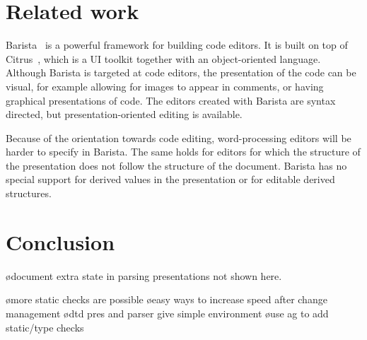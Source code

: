\documentclass[12pt]{article}
\begin{document}
%
\section{Related work}\label{sect:relatedWork}
%

\bc
{}





\noindent Barista~\cite{KoMyers06Barista} is a powerful framework for building code editors. It is built on top of Citrus~\cite{KoMyers05Citrus}, which is a UI toolkit together with an object-oriented language. Although Barista is targeted at code editors, the presentation of the code can be visual, for example allowing for images to appear in comments, or having graphical presentations of code. The editors created with Barista are syntax directed, but presentation-oriented editing is available. 

Because of the orientation towards code editing, word-processing editors will be harder to specify in Barista. The same holds for editors for which the structure of the presentation does not follow the structure of the document. Barista has no special support for derived values in the presentation or for editable derived structures.

\ec



%
\section{Conclusion}\label{sect:conclusion}
%


\bc
\bl
\o document extra state in parsing presentations not shown here.
\el

\bl
\o more static checks are possible
\o easy ways to increase speed after change management
\o dtd pres and parser give simple environment
\o use ag to add static/type checks
\el

\ec


%



\end{document}
